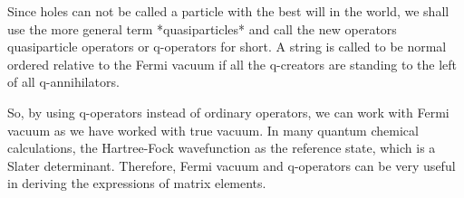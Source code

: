 \documentclass{article}
\begin{document}
Since holes can not be called a particle with the best will in the world,
we shall use the more general term *quasiparticles* and call the new operators
quasiparticle operators or q-operators for short. A string is called to be
normal ordered relative to the Fermi vacuum if all the q-creators are standing
to the left of all q-annihilators.

So, by using q-operators instead of ordinary operators, we can work with Fermi
vacuum as we have worked with true vacuum. In many quantum chemical calculations,
the Hartree-Fock wavefunction as the reference state, which is a Slater
determinant. Therefore, Fermi vacuum and q-operators can be very useful in
deriving the expressions of matrix elements.
\end{document}
